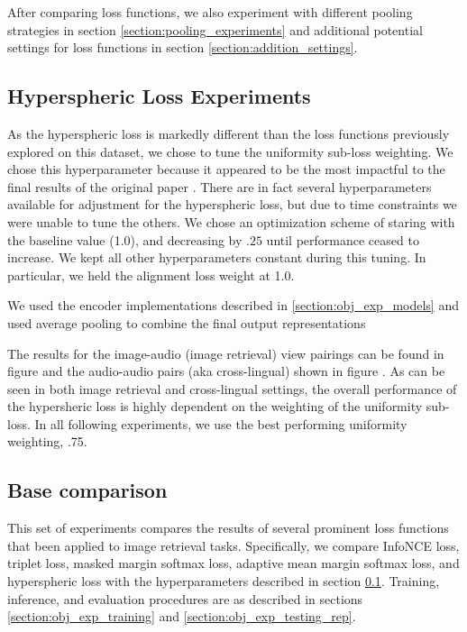 After comparing loss functions, we also experiment with different pooling strategies in section \ref{section:pooling_experiments} and additional potential settings for loss functions in section \ref{section:addition_settings}.




\subsection{Hyperspheric Loss Experiments}
\label{section:hyperspheric_tuning}
As the hyperspheric loss is markedly different than the loss functions previously explored on this dataset, we chose to tune the uniformity sub-loss weighting.
We chose this hyperparameter because it appeared to be the most impactful to the final results of the original paper .
There are in fact several hyperparameters available for adjustment for the hyperspheric loss, but due to time constraints we were unable to tune the others.
We chose an optimization scheme of staring with the baseline value (1.0), and decreasing by $.25$ until performance ceased to increase. 
We kept all other hyperparameters constant during this tuning. 
In particular, we held the alignment loss weight at 1.0.

We used the encoder implementations described in \ref{section:obj_exp_models} and used average pooling to combine the final output representations





The results for the image-audio (image retrieval) view pairings can be found in figure \dftwrds and the audio-audio pairs (aka cross-lingual) shown in figure \dftwrds.
As can be seen in both image retrieval and cross-lingual settings, the overall performance of the hypersheric loss is highly dependent on the weighting of the uniformity sub-loss.
In all following experiments, we use the best performing uniformity weighting, .75.

\subsection{Base comparison}
\label{section:direct_compare}

This set of experiments compares the results of several prominent loss functions that been applied to image retrieval tasks.
Specifically, we compare InfoNCE loss, triplet loss, masked margin softmax loss, adaptive mean margin softmax loss, and hyperspheric loss with the hyperparameters described in section \ref{section:hyperspheric_tuning}.
Training, inference, and evaluation procedures are as described in sections \ref{section:obj_exp_training} and \ref{section:obj_exp_testing_rep}.

